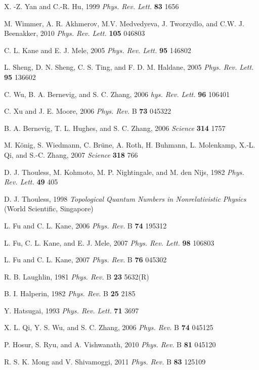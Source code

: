 \documentclass[aps,pra,amsmath,twocolumn,showpacs,bibnotes,10pt]{revtex4-1}
\begin{document}
\begin{thebibliography}{99}
 X. -Z. Yan and C.-R. Hu, 1999 {\it Phys. Rev. Lett.} {\bf 83} 1656

 M. Wimmer, A. R. Akhmerov, M.V. Medvedyeva, J. Tworzydlo, and C.W. J. Beenakker, 2010 {\it Phys. Rev. Lett.} {\bf 105} 046803

 C. L. Kane and E. J. Mele, 2005 {\it Phys. Rev. Lett.} {\bf 95} 146802

 L. Sheng, D. N. Sheng, C. S. Ting, and F. D. M. Haldane, 2005 {\it Phys. Rev. Lett.} {\bf 95} 136602

 C. Wu, B. A. Bernevig, and S. C. Zhang, 2006 {\it hys. Rev. Lett.} {\bf 96} 106401

 C. Xu and J. E. Moore, 2006 {\it Phys. Rev.} B {\bf 73} 045322

 B. A. Bernevig, T. L. Hughes, and S. C. Zhang, 2006 {\it Science} {\bf 314} 1757

 M. K\"onig, S. Wiedmann, C. Br\"une, A. Roth, H. Buhmann, L. Molenkamp, X.-L. Qi, and S.-C. Zhang, 2007 {\it Science} {\bf 318} 766

 D. J. Thouless, M. Kohmoto, M. P. Nightingale, and M. den Nijs, 1982 {\it Phys. Rev. Lett.} {\bf 49} 405

 D. J. Thouless, 1998 {\it Topological Quantum Numbers in Nonrelativistic Physics} (World Scientific, Singapore)

  L. Fu and C. L. Kane, 2006 {\it Phys. Rev.} B {\bf 74} 195312

 L. Fu, C. L. Kane, and E. J. Mele, 2007 {\it Phys. Rev. Lett.} {\bf 98} 106803

 L. Fu and C. L. Kane, 2007 {\it Phys. Rev.} B {\bf 76} 045302

 R. B. Laughlin, 1981 {\it Phys. Rev.} B {\bf 23} 5632(R)

 B. I. Halperin, 1982 {\it Phys. Rev.} B {\bf 25} 2185

 Y. Hatsugai, 1993 {\it Phys. Rev. Lett.} {\bf 71} 3697

 X. L. Qi, Y. S. Wu, and S. C. Zhang, 2006 {\it Phys. Rev.} B {\bf 74} 045125

 P. Hosur, S. Ryu, and A. Vishwanath, 2010 {\it Phys. Rev.} B {\bf 81} 045120

 R. S. K. Mong and V. Shivamoggi, 2011 {\it Phys. Rev.} B {\bf 83} 125109


\end{thebibliography}
\end{document}
